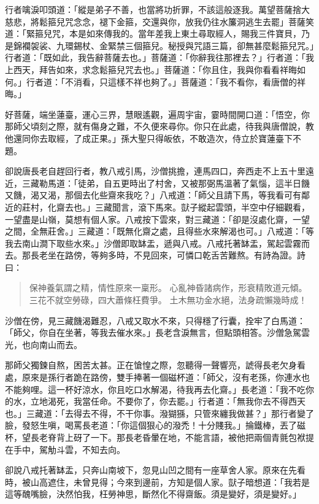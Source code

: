 行者噙淚叩頭道：「縱是弟子不善，也當將功折罪，不該這般逐我。萬望菩薩捨大慈悲，將鬆箍兒咒念念，褪下金箍，交還與你，放我仍往水簾洞逃生去罷」菩薩笑道：「緊箍兒咒，本是如來傳我的。當年差我上東土尋取經人，賜我三件寶貝，乃是錦襴袈裟、九環錫杖、金緊禁三個箍兒。秘授與咒語三篇，卻無甚麼鬆箍兒咒。」行者道：「既如此，我告辭菩薩去也。」菩薩道：「你辭我往那裡去？」行者道：「我上西天，拜告如來，求念鬆箍兒咒去也。」菩薩道：「你且住，我與你看看祥晦如何。」行者道：「不消看，只這樣不祥也夠了。」菩薩道：「我不看你，看唐僧的祥晦。」

好菩薩，端坐蓮臺，運心三界，慧眼遙觀，遍周宇宙，霎時間開口道：「悟空，你那師父頃刻之際，就有傷身之難，不久便來尋你。你只在此處，待我與唐僧說，教他還同你去取經，了成正果。」孫大聖只得皈依，不敢造次，侍立於寶蓮臺下不題。

卻說唐長老自趕回行者，教八戒引馬，沙僧挑擔，連馬四口，奔西走不上五十里遠近，三藏勒馬道：「徒弟，自五更時出了村舍，又被那弼馬溫著了氣惱，這半日饑又饑，渴又渴，那個去化些齋來我吃？」八戒道：「師父且請下馬，等我看可有鄰近的莊村，化齋去也。」三藏聞言，滾下馬來。獃子縱起雲頭，半空中仔細觀看，一望盡是山嶺，莫想有個人家。八戒按下雲來，對三藏道：「卻是沒處化齋，一望之間，全無莊舍。」三藏道：「既無化齋之處，且得些水來解渴也可。」八戒道：「等我去南山澗下取些水來。」沙僧即取缽盂，遞與八戒。八戒托著缽盂，駕起雲霧而去。那長老坐在路傍，等夠多時，不見回來，可憐口乾舌苦難熬。有詩為證。詩曰：
\begin{quote}
保神養氣謂之精，情性原來一稟形。
心亂神昏諸病作，形衰精敗道元傾。
三花不就空勞碌，四大蕭條枉費爭。
土木無功金水絕，法身疏懶幾時成！
\end{quote}

沙僧在傍，見三藏饑渴難忍，八戒又取水不來，只得穩了行囊，拴牢了白馬道：「師父，你自在坐著，等我去催水來。」長老含淚無言，但點頭相答。沙僧急駕雲光，也向南山而去。

那師父獨鍊自熬，困苦太甚。正在愴惶之際，忽聽得一聲響亮，諕得長老欠身看處，原來是孫行者跪在路傍，雙手捧著一個磁杯道：「師父，沒有老孫，你連水也不能夠哩。這一杯好涼水，你且吃口水解渴，待我再去化齋。」長老道：「我不吃你的水，立地渴死，我當任命。不要你了，你去罷。」行者道：「無我你去不得西天也。」三藏道：「去得去不得，不干你事。潑猢猻，只管來纏我做甚？」那行者變了臉，發怒生嗔，喝罵長老道：「你這個狠心的潑禿！十分賤我。」掄鐵棒，丟了磁杯，望長老脊背上砑了一下。那長老昏暈在地，不能言語，被他把兩個青氈包袱提在手中，駕觔斗雲，不知去向。

卻說八戒托著缽盂，只奔山南坡下，忽見山凹之間有一座草舍人家。原來在先看時，被山高遮住，未曾見得；今來到邊前，方知是個人家。獃子暗想道：「我若是這等醜嘴臉，決然怕我，枉勞神思，斷然化不得齋飯。須是變好，須是變好。」

